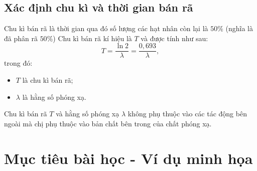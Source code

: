 \subsection{Xác định chu kì và thời gian bán rã}

Chu kì bán rã là thời gian qua đó số lượng các hạt nhân còn lại là $50\%$ (nghĩa là đã phân rã $50\%$) Chu kì bán rã kí hiệu là $T$ và được tính như sau:
\begin{equation}
	T=\dfrac{\ln 2}{\lambda}=\dfrac{0,693}{\lambda},
\end{equation}
trong đó:
\begin{itemize}
	\item $T$ là chu kì bán rã;
	\item $\lambda$ là hằng số phóng xạ.
\end{itemize}

Chu kì bán rã $T$ và hằng số phóng xạ $\lambda$ không phụ thuộc vào các tác động bên ngoài mà chị phụ thuộc vào bản chất bên trong của chất phóng xạ.


\section{Mục tiêu bài học - Ví dụ minh họa}

